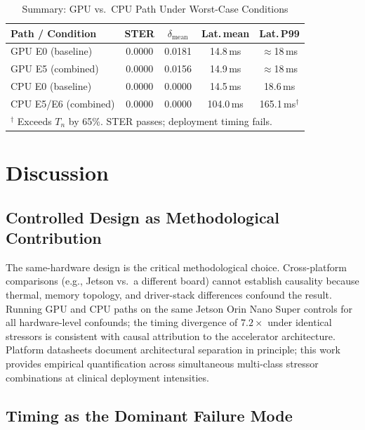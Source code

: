 \documentclass[journal,10pt,twocolumn]{IEEEtran}
\begin{document}
\begin{table}[!t]
\caption{Summary: GPU vs.\ CPU Path Under Worst-Case Conditions}
\label{tab:summary}
\centering
\small
\begin{tabular}{lcccc}
\toprule
\textbf{Path / Condition} & \textbf{STER} & \boldmath$\delta_\text{mean}$ & \textbf{Lat.\,mean} & \textbf{Lat.\,P99} \\
\midrule
GPU E0 (baseline)     & 0.0000 & 0.0181 & 14.8\,ms & $\approx$18\,ms \\
GPU E5 (combined)     & 0.0000 & 0.0156 & 14.9\,ms & $\approx$18\,ms \\
CPU E0 (baseline)     & 0.0000 & 0.0000 & 14.5\,ms & 18.6\,ms \\
CPU E5/E6 (combined)  & 0.0000 & 0.0000 & 104.0\,ms & 165.1\,ms$^\dagger$ \\
\bottomrule
\multicolumn{5}{l}{$^\dagger$ Exceeds $T_n$ by 65\%. STER passes; deployment timing fails.}
\end{tabular}
\end{table}

\section{Discussion}

\subsection{Controlled Design as Methodological Contribution}

The same-hardware design is the critical methodological choice.
Cross-platform comparisons (e.g., Jetson vs.\ a different board) cannot
establish causality because thermal, memory topology, and driver-stack
differences confound the result.
Running GPU and CPU paths on the same Jetson Orin Nano Super controls
for all hardware-level confounds; the timing divergence of $7.2{\times}$
under identical stressors is consistent with causal attribution to the
accelerator architecture.
Platform datasheets document architectural separation in principle;
this work provides empirical quantification across simultaneous
multi-class stressor combinations at clinical deployment intensities.

\subsection{Timing as the Dominant Failure Mode}
\end{document}
